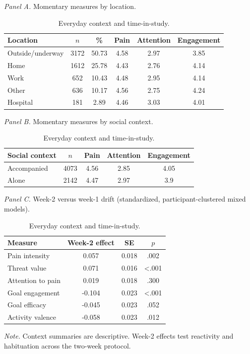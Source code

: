 \begin{table}[!htbp]
\raggedright
\caption{Everyday context and time-in-study.}
\label{tab:sup-context}
\footnotesize
\begingroup
\setlength{\tabcolsep}{4pt}
\renewcommand{\arraystretch}{1.08}
\noindent\textit{Panel A.} Momentary measures by location.\par\vspace{2pt}
\begin{tabular*}{\textwidth}{@{\extracolsep{\fill}}lccccc@{}}
\toprule
Location & $n$ & \% & Pain & Attention & Engagement \\
\midrule
Outside/underway & 3172 & 50.73 & 4.58 & 2.97 & 3.85 \\
Home & 1612 & 25.78 & 4.43 & 2.76 & 4.14 \\
Work & 652 & 10.43 & 4.48 & 2.95 & 4.14 \\
Other & 636 & 10.17 & 4.56 & 2.75 & 4.24 \\
Hospital & 181 & 2.89 & 4.46 & 3.03 & 4.01 \\
\bottomrule
\end{tabular*}
\par\vspace{6pt}\noindent\textit{Panel B.} Momentary measures by social context.\par\vspace{2pt}
\begin{tabular*}{\textwidth}{@{\extracolsep{\fill}}lcccc@{}}
\toprule
Social context & $n$ & Pain & Attention & Engagement \\
\midrule
Accompanied & 4073 & 4.56 & 2.85 & 4.05 \\
Alone & 2142 & 4.47 & 2.97 & 3.9 \\
\bottomrule
\end{tabular*}
\par\vspace{6pt}\noindent\textit{Panel C.} Week-2 versus week-1 drift (standardized, participant-clustered mixed models).\par\vspace{2pt}
\begin{tabular*}{\textwidth}{@{\extracolsep{\fill}}lccc@{}}
\toprule
Measure & Week-2 effect & SE & $p$ \\
\midrule
Pain intensity & 0.057 & 0.018 & .002 \\
Threat value & 0.071 & 0.016 & <.001 \\
Attention to pain & 0.019 & 0.018 & .300 \\
Goal engagement & -0.104 & 0.023 & <.001 \\
Goal efficacy & -0.045 & 0.023 & .052 \\
Activity valence & -0.058 & 0.023 & .012 \\
\bottomrule
\end{tabular*}
\par\vspace{3pt}\noindent\parbox{\textwidth}{\footnotesize\textit{Note.} Context summaries are descriptive. Week-2 effects test reactivity and habituation across the two-week protocol.}
\endgroup
\end{table}
